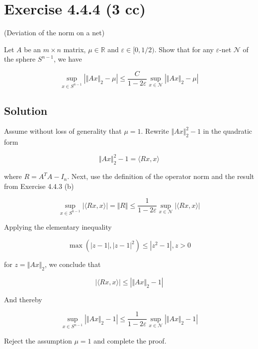 \documentclass{article}
\begin{document}
\section{Exercise 4.4.4 (3 cc)}
(Deviation of the norm on a net)

Let $A$ be an $m \times n$ matrix, $\mu \in \mathbb R$ and $\varepsilon \in [0,1/2)$. Show that for any $\varepsilon$-net $\mathcal N$ of the sphere $S^{n-1}$, we have

$$\sup_{x \in S^{n-1}}|\Vert Ax \Vert_2 - \mu| \leq \frac{C}{1 - 2\varepsilon}\sup_{x \in \mathcal N}|\Vert Ax \Vert_2 - \mu|$$

\subsection{Solution}

Assume without loss of generality that $\mu = 1$. Rewrite $\Vert Ax \Vert_2^2 - 1$ in the quadratic form

$$\Vert Ax \Vert_2^2 - 1 = \langle Rx, x \rangle$$

where $R = A^TA - I_n$. Next, use the definition of the operator norm and the result from Exercise 4.4.3 (b)

$$\sup_{x \in S^{n-1}}|\langle Rx, x \rangle| = \Vert R \Vert \leq \frac{1}{1-2\varepsilon}\sup_{x \in \mathcal N}|\langle Rx, x \rangle|$$

Applying the elementary inequality

$$\max(|z-1|, |z - 1|^2) \leq |z^2 - 1|, z>0$$

for $z = \Vert Ax \Vert_2$, we conclude that

$$|\langle Rx, x \rangle| \leq |\Vert Ax \Vert_2 - 1|$$

And thereby

$$\sup_{x \in S^{n-1}}|\Vert Ax \Vert_2 - 1| \leq \frac{1}{1 - 2\varepsilon}\sup_{x \in \mathcal N}|\Vert Ax \Vert_2 - 1|$$

Reject the assumption $\mu = 1$ and complete the proof.
\end{document}
